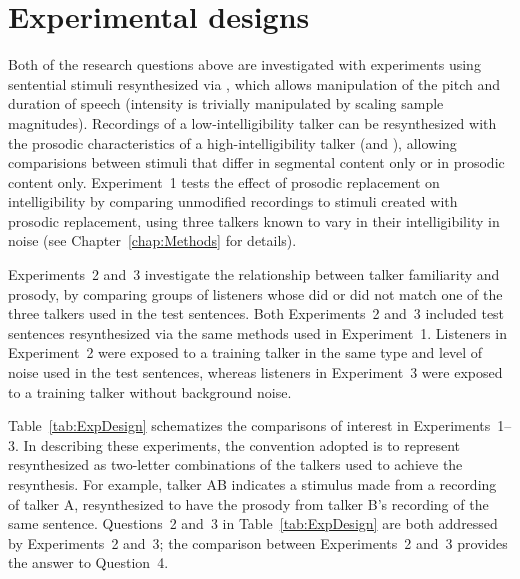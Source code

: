 \section{Experimental designs}
Both of the research questions above are investigated with experiments using sentential stimuli resynthesized via \psola{} \citep{MoulinesCharpentier1990}, which allows manipulation of the pitch and duration of speech (intensity is trivially manipulated by scaling sample magnitudes).  Recordings of a low-intelligibility talker can be resynthesized with the prosodic characteristics of a high-intelligibility talker (and \vv), allowing comparisions between stimuli that differ in segmental content only or in prosodic content only.  Experiment~1 tests the effect of prosodic replacement on intelligibility by comparing unmodified recordings to stimuli created with prosodic replacement, using three talkers known to vary in their intelligibility in noise (see Chapter~\ref{chap:Methods} for details).

Experiments~2 and~3 investigate the relationship between talker familiarity and prosody, by comparing groups of listeners whose  did or did not match one of the three talkers used in the test sentences.  Both Experiments~2 and~3 included test sentences resynthesized via the same methods used in Experiment~1.  Listeners in Experiment~2 were exposed to a training talker in the same type and level of noise used in the test sentences, whereas listeners in Experiment~3 were exposed to a training talker without background noise.

Table~\ref{tab:ExpDesign} schematizes the comparisons of interest in Experiments~1–3.  In describing these experiments, the convention adopted is to represent resynthesized  as two-letter combinations of the talkers used to achieve the resynthesis.  For example, talker AB indicates a stimulus made from a recording of talker A, resynthesized to have the prosody from talker B’s recording of the same sentence.  Questions~2 and~3 in Table~\ref{tab:ExpDesign} are both addressed by Experiments~2 and~3; the comparison between Experiments~2 and~3 provides the answer to Question~4.
 
